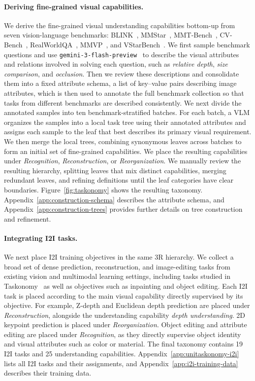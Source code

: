 \paragraph{Deriving fine-grained visual capabilities.}
We derive the fine-grained visual understanding capabilities bottom-up from seven vision-language benchmarks: BLINK~\citep{fu2024blink}, MMStar~\citep{chen2024wemmstar}, MMT-Bench~\citep{ying2024mmt}, CV-Bench~\citep{tong2024cambrian}, RealWorldQA~\citep{xai2024realworldqa}, MMVP~\citep{tong2024eyes}, and VStarBench~\citep{wu2024vstarbench}.
We first sample benchmark questions and use \texttt{gemini-3-flash-preview}~\citep{gemini3flash} to describe the visual attributes and relations involved in solving each question, such as \emph{relative depth}, \emph{size comparison}, and \emph{occlusion}.
Then we review these descriptions and consolidate them into a fixed attribute schema, a list of key--value pairs describing image attributes, which is then used to annotate the full benchmark collection so that tasks from different benchmarks are described consistently.
We next divide the annotated samples into ten benchmark-stratified batches.
For each batch, a VLM organizes the samples into a local task tree using their annotated attributes and assigns each sample to the leaf that best describes its primary visual requirement.
We then merge the local trees, combining synonymous leaves across batches to form an initial set of fine-grained capabilities.
We place the resulting capabilities under \textit{Recognition}, \textit{Reconstruction}, or \textit{Reorganization}.
We manually review the resulting hierarchy, splitting leaves that mix distinct capabilities, merging redundant leaves, and refining definitions until the leaf categories have clear boundaries.
Figure~\ref{fig:taskonomy} shows the resulting taxonomy.
Appendix~\ref{app:construction-schema} describes the attribute schema, and Appendix~\ref{app:construction-trees} provides further details on tree construction and refinement.

\paragraph{Integrating I2I tasks.}
We next place I2I training objectives in the same 3R hierarchy.
We collect a broad set of dense prediction, reconstruction, and image-editing tasks from existing vision and multimodal learning settings, including tasks studied in Taskonomy~\citep{zamir2018taskonomy} as well as objectives such as inpainting and object editing.
Each I2I task is placed according to the main visual capability directly supervised by its objective.
For example, Z-depth and Euclidean depth prediction are placed under \textit{Reconstruction}, alongside the understanding capability \textit{depth understanding}.
2D keypoint prediction is placed under \textit{Reorganization}.
Object editing and attribute editing are placed under \textit{Recognition}, as they directly supervise object identity and visual attributes such as color or material.
The final taxonomy contains 19 I2I tasks and 25 understanding capabilities.
Appendix~\ref{app:unitaskonomy-i2i} lists all I2I tasks and their assignments, and Appendix~\ref{app:i2i-training-data} describes their training data.

